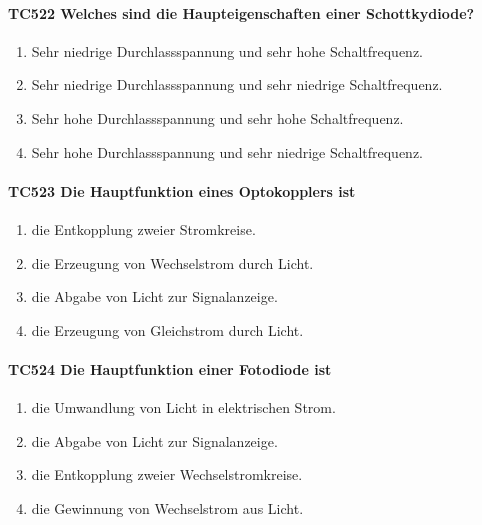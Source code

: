 \documentclass[8pt]{article}
\begin{document}
\begin{enumerate}
\begin{enumerate}[nolistsep,label=\Alph*]
{\begin{enumerate}[nolistsep,label=\Alph*]
\paragraph*{TC522 Welches sind die Haupteigenschaften einer Schottkydiode?}
\begin{enumerate}[nolistsep,label=\Alph*]
\item Sehr niedrige Durchlassspannung und sehr hohe Schaltfrequenz.
\item Sehr niedrige Durchlassspannung und sehr niedrige Schaltfrequenz.
\item Sehr hohe Durchlassspannung und sehr hohe Schaltfrequenz.
\item Sehr hohe Durchlassspannung und sehr niedrige Schaltfrequenz.
\end{enumerate}

\paragraph*{TC523 Die Hauptfunktion eines Optokopplers ist}
\begin{enumerate}[nolistsep,label=\Alph*]
\item die Entkopplung zweier Stromkreise.
\item die Erzeugung von Wechselstrom durch Licht.
\item die Abgabe von Licht zur Signalanzeige.
\item die Erzeugung von Gleichstrom durch Licht.
\end{enumerate}

\paragraph*{TC524 Die Hauptfunktion einer Fotodiode ist}
\begin{enumerate}[nolistsep,label=\Alph*]
\item die Umwandlung von Licht in elektrischen Strom.
\item die Abgabe von Licht zur Signalanzeige.
\item die Entkopplung zweier Wechselstromkreise.
\item die Gewinnung von Wechselstrom aus Licht.
\end{enumerate}


\end{enumerate}}
\end{enumerate}
\end{enumerate}
\end{document}
